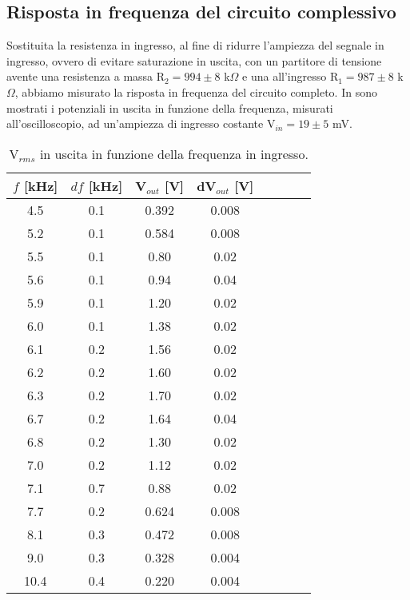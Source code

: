 \subsection{Risposta in frequenza del circuito complessivo}
Sostituita la resistenza in ingresso, al fine di ridurre l'ampiezza del segnale in ingresso, ovvero di evitare saturazione in uscita, con un partitore di tensione avente una resistenza a massa R$_2 = 994 \pm 8$ k$\Omega$ e una all'ingresso R$_1 = 987 \pm 8$ k$\Omega$, abbiamo misurato la risposta in frequenza del circuito completo. In  sono mostrati i potenziali in uscita in funzione della frequenza, misurati all'oscilloscopio, ad un'ampiezza di ingresso costante V$_{in} = 19 \pm 5$ mV.\\
\begin{table}[h]
	\centering
	\begin{tabular}{cccccccc}		
		 {$f$ [kHz]}& {$df$ [kHz]}& {V$_{out}$ [V]} & {dV$_{out}$ [V]}\\
		 \midrule
                      4.5 & 0.1 & 0.392 & 0.008\\
                      5.2 & 0.1 & 0.584 & 0.008\\
                      5.5 & 0.1 & 0.80 &	0.02\\
                      5.6 & 0.1 & 0.94 & 0.04\\
                      5.9 & 0.1 & 1.20 & 0.02\\
                      6.0 & 0.1 & 1.38 & 0.02\\
                      6.1 & 0.2 & 1.56 & 0.02\\
                      6.2 & 0.2 & 1.60 & 0.02\\
                      6.3 & 0.2 & 1.70 & 0.02\\
                      6.7 & 0.2 & 1.64 & 0.04\\
                      6.8 & 0.2 & 1.30 & 0.02\\	
                      7.0 & 0.2 & 1.12 & 0.02\\
                      7.1 & 0.7 & 0.88 & 0.02\\
                      7.7 & 0.2 & 0.624 & 0.008\\
                      8.1 & 0.3 & 0.472 & 0.008\\
                      9.0 & 0.3 & 0.328 & 0.004\\
                      10.4 & 0.4 & 0.220 & 0.004\\
 	\end{tabular}
	\caption{V$_{rms}$ in uscita in funzione della frequenza in ingresso.}
	\label{t:frequenza}
\end{table}
